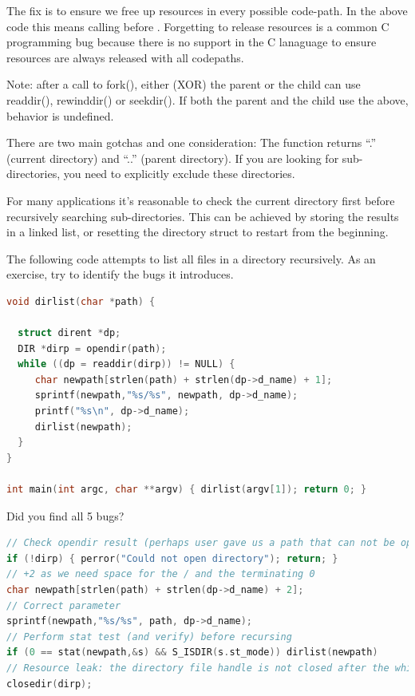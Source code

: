 The fix is to ensure we free up resources in every possible code-path. In the above code this means calling  before . Forgetting to release resources is a common C programming bug because there is no support in the C lanaguage to ensure resources are always released with all codepaths.


Note: after a call to fork(), either (XOR) the parent or the child can use readdir(), rewinddir() or seekdir(). If both the parent and the child use the above, behavior is undefined.

There are two main gotchas and one consideration: The  function returns ``.'' (current directory) and ``..'' (parent directory). If you are looking for sub-directories, you need to explicitly exclude these directories.

For many applications it's reasonable to check the current directory first before recursively searching sub-directories. This can be achieved by storing the results in a linked list, or resetting the directory struct to restart from the beginning.

The following code attempts to list all files in a directory recursively. As an exercise, try to identify the bugs it introduces.

\begin{lstlisting}[language=C]
void dirlist(char *path) {

  struct dirent *dp;
  DIR *dirp = opendir(path);
  while ((dp = readdir(dirp)) != NULL) {
     char newpath[strlen(path) + strlen(dp->d_name) + 1];
     sprintf(newpath,"%s/%s", newpath, dp->d_name);
     printf("%s\n", dp->d_name);
     dirlist(newpath);
  }
}

int main(int argc, char **argv) { dirlist(argv[1]); return 0; }
\end{lstlisting}

Did you find all 5 bugs?

\begin{lstlisting}[language=C]
// Check opendir result (perhaps user gave us a path that can not be opened as a directory
if (!dirp) { perror("Could not open directory"); return; }
// +2 as we need space for the / and the terminating 0
char newpath[strlen(path) + strlen(dp->d_name) + 2];
// Correct parameter
sprintf(newpath,"%s/%s", path, dp->d_name);
// Perform stat test (and verify) before recursing
if (0 == stat(newpath,&s) && S_ISDIR(s.st_mode)) dirlist(newpath)
// Resource leak: the directory file handle is not closed after the while loop
closedir(dirp);
\end{lstlisting}

